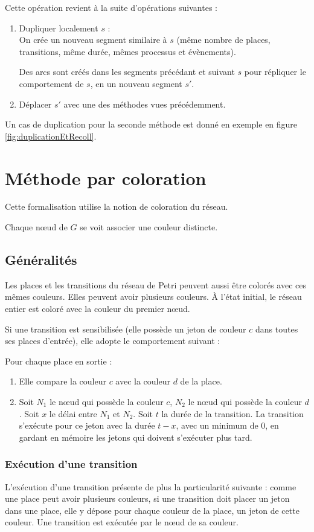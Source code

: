 Cette opération revient à la suite d'opérations suivantes : 
\begin{enumerate}
\item Dupliquer localement $s$ : \\
		On crée un nouveau segment similaire à $s$ (même nombre de places, transitions, même durée, mêmes processus et évènements).
		
		Des arcs sont créés dans les segments précédant et suivant $s$ pour répliquer le comportement de $s$, en un nouveau segment $s'$.
\item Déplacer $s'$ avec une des méthodes vues précédemment.
\end{enumerate}

Un cas de duplication pour la seconde méthode est donné en exemple en figure \ref{fig:duplicationEtRecoll}.

\section{Méthode par coloration}
Cette formalisation utilise la notion de coloration du réseau.

Chaque nœud de $G$ se voit associer une couleur distincte.

\subsection{Généralités}
Les places et les transitions du réseau de Petri peuvent aussi être colorés avec ces mêmes couleurs. Elles peuvent avoir plusieurs couleurs.
À l'état initial, le réseau entier est coloré avec la couleur du premier nœud.

Si une transition est sensibilisée (elle possède un jeton de couleur $c$ dans toutes ses places d'entrée), elle adopte le comportement suivant : 

Pour chaque place en sortie :
\begin{enumerate}
\item Elle compare la couleur $c$ avec la couleur $d$ de la place. 
\item Soit $N_1$ le nœud qui possède la couleur $c$, $N_2$ le nœud qui possède la couleur $d$. Soit $x$ le délai entre $N_1$ et $N_2$. Soit $t$ la durée de la transition. La transition s'exécute pour ce jeton avec la durée $t - x$, avec un minimum de 0, en gardant en mémoire les jetons qui doivent s'exécuter plus tard.
\end{enumerate}

\subsubsection{Exécution d'une transition}
L'exécution d'une transition présente de plus la particularité suivante : comme une place peut avoir plusieurs couleurs, si une transition doit placer un jeton dans une place, elle y dépose pour chaque couleur de la place, un jeton de cette couleur. 
Une transition est exécutée par le nœud de sa couleur.


